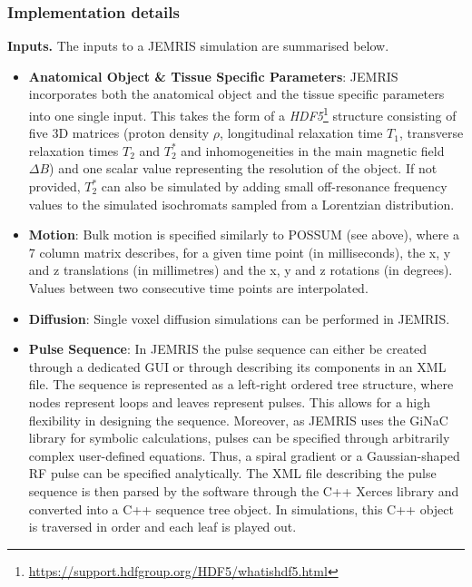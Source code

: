 \hfill

\subsubsection{Implementation details}

\textbf{Inputs.} The inputs to a JEMRIS simulation are summarised below.

\begin{itemize}
    
    \item \textbf{Anatomical Object \& Tissue Specific Parameters}: JEMRIS incorporates both the anatomical object and the tissue specific parameters into one single input.
    This takes the form of a \textit{HDF5}\footnote{\url{https://support.hdfgroup.org/HDF5/whatishdf5.html}} structure consisting of five 3D matrices (proton density $\rho$, longitudinal relaxation time $T_1$, transverse relaxation times $T_2$ and $T_2^*$ and inhomogeneities in the main magnetic field $\Delta B$) and one scalar value representing the resolution of the object.
    If not provided, $T_2^*$ can also be simulated by adding small off-resonance frequency values to the simulated isochromats sampled from a Lorentzian distribution. 

    \item \textbf{Motion}: Bulk motion is specified similarly to POSSUM (see above), where a 7 column matrix describes, for a given time point (in milliseconds), the x, y and z translations (in millimetres) and the x, y and z rotations (in degrees). 
    Values between two consecutive time points are interpolated. 
    
    \item \textbf{Diffusion}: Single voxel diffusion simulations can be performed in JEMRIS. 
    
    \item \textbf{Pulse Sequence}: In JEMRIS the pulse sequence can either be created through a dedicated GUI or through describing its components in an XML file.
    The sequence is represented as a left-right ordered tree structure, where nodes represent loops and leaves represent pulses.
    This allows for a high flexibility in designing the sequence.
    Moreover, as JEMRIS uses the GiNaC library for symbolic calculations, pulses can be specified through arbitrarily complex user-defined equations.
    Thus, a spiral gradient or a Gaussian-shaped RF pulse can be specified analytically.
    The XML file describing the pulse sequence is then parsed by the software through the C++ Xerces library and converted into a C++ sequence tree object.
    In simulations, this C++ object is traversed in order and each leaf is played out.
    

\end{itemize}
